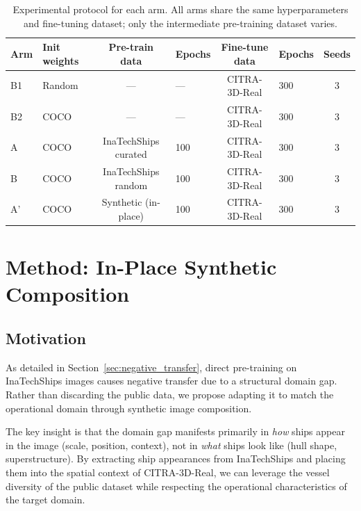 \documentclass[a4paper,fleqn]{cas-dc}
\begin{document}
\begin{table}[!htbp]
\caption{Experimental protocol for each arm. All arms share the same hyperparameters and fine-tuning dataset; only the intermediate pre-training dataset varies.}\label{tab:protocol}
\begin{tabular}{@{}llclclc@{}}
\toprule
Arm & Init weights & Pre-train data & Epochs & Fine-tune data & Epochs & Seeds \\
\midrule
B1 & Random & --- & --- & CITRA-3D-Real & 300 & 3 \\
B2 & COCO & --- & --- & CITRA-3D-Real & 300 & 3 \\
A  & COCO & InaTechShips curated & 100 & CITRA-3D-Real & 300 & 3 \\
B  & COCO & InaTechShips random  & 100 & CITRA-3D-Real & 300 & 3 \\
A' & COCO & Synthetic (in-place) & 100 & CITRA-3D-Real & 300 & 3 \\
\bottomrule
\end{tabular}
\end{table}

\section{Method: In-Place Synthetic Composition}\label{sec:method}

\subsection{Motivation}\label{sec:motivation}

As detailed in Section~\ref{sec:negative_transfer}, direct pre-training on InaTechShips images causes negative transfer due to a structural domain gap. Rather than discarding the public data, we propose adapting it to match the operational domain through synthetic image composition.

The key insight is that the domain gap manifests primarily in \emph{how} ships appear in the image (scale, position, context), not in \emph{what} ships look like (hull shape, superstructure). By extracting ship appearances from InaTechShips and placing them into the spatial context of CITRA-3D-Real, we can leverage the vessel diversity of the public dataset while respecting the operational characteristics of the target domain.
\end{document}

